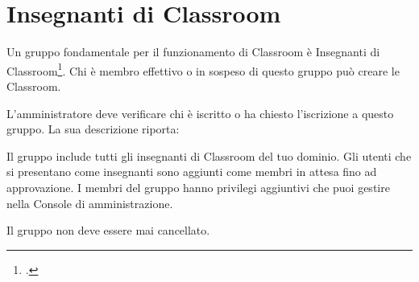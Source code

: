 \section{Insegnanti di Classroom}
Un gruppo fondamentale per il funzionamento di Classroom è Insegnanti di Classroom\footcite{Google2023}. Chi è membro effettivo o in sospeso di questo  gruppo può creare le Classroom. 

L'amministratore deve verificare chi è iscritto o ha chiesto l'iscrizione a questo gruppo. La sua descrizione riporta:

	Il gruppo include tutti gli insegnanti di Classroom del tuo dominio. Gli utenti che si presentano come insegnanti sono aggiunti come membri in attesa fino ad approvazione. I membri del gruppo hanno privilegi aggiuntivi che puoi gestire nella Console di amministrazione.

Il gruppo non deve essere mai cancellato.
